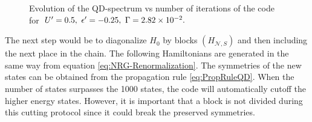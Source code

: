 \begin{figure}[t]
	\caption{\label{Fig-Dot-Spectrum} Evolution of the QD-spectrum vs number of
	iterations of the code for $U'=0.5,\ \ep'=-0.25,\ \Gamma=2.82\times10^{-2}.$ }
\end{figure}

The next step would be to diagonalize $H_{0}$ by blocks $(H_{\mathcal{N},S})$ and then including the next place in the chain. The following Hamiltonians are generated in the same way from equation \eqref{eq:NRG-Renormalization}. The symmetries of the new states can be obtained from the propagation rule \eqref{eq:PropRuleQD}. When the number of states surpasses the 1000 states, the code will automatically cutoff the higher energy states. However, it is important that a block is not divided during this cutting protocol since it could break the preserved symmetries. 


